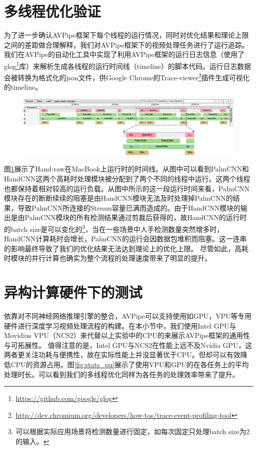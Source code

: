 \section{多线程优化验证}
为了进一步确认AVPipe框架下每个线程的运行情况，同时对优化结果和理论上限之间的差距做合理解释，我们对AVPipe框架下的视频处理任务进行了运行追踪。我们在AVPipe的自动化工具中实现了利用AVPipe框架的运行日志信息（使用了glog\footnote{\url{https://github.com/google/glog}}库）来解析生成各线程的运行时间线（timeline）的脚本代码。运行日志数据会被转换为格式化的json文件，供Google Chrome的Trace-viewer\footnote{\url{http://dev.chromium.org/developers/how-tos/trace-event-profiling-tool}}插件生成可视化的timeline。\par
\begin{figure}[htp]
    \centering
    \includegraphics[width=\textwidth]{figure/trace_new.png}
    \label{fig:trace}
\end{figure}
图\ref{fig:trace}展示了Hand-raw在MacBook上运行时的时间线。从图中可以看到PalmCNN和HandCNN这两个高耗时处理模块被分配到了两个不同的线程中运行。这两个线程也都保持着相对较高的运行负载。从图中所示的这一段运行时间来看，PalmCNN模块存在的断断续续的阻塞是由HandCNN模块无法及时处理掉PalmCNN的结果，导致PalmCNN所连接的Stream容量已满而造成的。由于HandCNN模块的输出是由PalmCNN模块的所有检测结果通过剪裁后获得的，故HandCNN的运行时的batch size是可以变化的\footnote{可以根据实际应用场景将检测数量进行固定，如每次固定只处理batch size为2的输入。}，当在一些场景中人手检测数量突然增多时，HandCNN计算耗时会增长，PalmCNN的运行会因数据包堆积而阻塞。这一连串的影响最终导致了我们的优化结果无法达到理论上的优化上限。
尽管如此，高耗时模块的并行计算也确实为整个流程的处理速度带来了明显的提升。

\section{异构计算硬件下的测试}
依靠对不同神经网络推理引擎的整合，AVPipe可以支持使用如GPU，VPU等专用硬件进行深度学习视频处理流程的构建。在本小节中，我们使用Intel GPU与Movidius VPU（NCS2）来代替以上实验中的CPU的来展示AVPipe框架的通用性与可拓展性。
值得注意的是，Intel GPU与NCS2在性能上远不及Nvidia GPU，这两者更关注功耗与便携性，故在实际性能上并没显著优于CPU。但却可以有效降低CPU的资源占用。图\ref{fig:stats_pu}展示了使用VPU和GPU的在各任务上的平均处理时长。可以看到我们的多线程优化同样为各任务的处理效率带来了提升。\par


